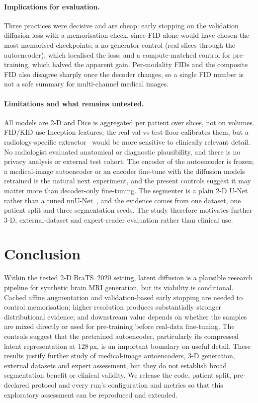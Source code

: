 \documentclass[10pt,a4paper]{article}
\begin{document}
\paragraph{Implications for evaluation.} Three practices were decisive and are cheap: early stopping on the validation diffusion loss with a memorisation check, since FID alone would have chosen the most memorised checkpoints; a no-generator control (real slices through the autoencoder), which localised the loss; and a compute-matched control for pre-training, which halved the apparent gain. Per-modality FIDs and the composite FID also disagree sharply once the decoder changes, so a single FID number is not a safe summary for multi-channel medical images.

\paragraph{Limitations and what remains untested.} All models are 2-D and Dice is aggregated per patient over slices, not on volumes. FID/KID use Inception features; the real val-vs-test floor calibrates them, but a radiology-specific extractor~\citep{mei2022radimagenet} would be more sensitive to clinically relevant detail. No radiologist evaluated anatomical or diagnostic plausibility, and there is no privacy analysis or external test cohort. The encoder of the autoencoder is frozen; a medical-image autoencoder or an encoder fine-tune with the diffusion models retrained is the natural next experiment, and the present controls suggest it may matter more than decoder-only fine-tuning. The segmenter is a plain 2-D U-Net rather than a tuned nnU-Net~\citep{isensee2021nnunet}, and the evidence comes from one dataset, one patient split and three segmentation seeds. The study therefore motivates further 3-D, external-dataset and expert-reader evaluation rather than clinical use.

\FloatBarrier
\section{Conclusion}
Within the tested 2-D BraTS~2020 setting, latent diffusion is a plausible research pipeline for synthetic brain MRI generation, but its viability is conditional. Cached affine augmentation and validation-based early stopping are needed to control memorisation; higher resolution produces substantially stronger distributional evidence; and downstream value depends on whether the samples are mixed directly or used for pre-training before real-data fine-tuning. The controls suggest that the pretrained autoencoder, particularly its compressed latent representation at 128\,px, is an important boundary on useful detail. These results justify further study of medical-image autoencoders, 3-D generation, external datasets and expert assessment, but they do not establish broad segmentation benefit or clinical validity. We release the code, patient split, pre-declared protocol and every run's configuration and metrics so that this exploratory assessment can be reproduced and extended.
\end{document}
